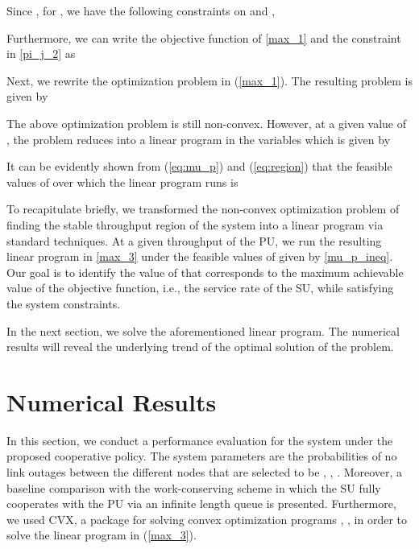 \documentclass[conference]{IEEEtran}
\begin{document}
Since , for , we have the
following constraints on  and ,


Furthermore, we can write the objective function of \eqref{max_1}
 and the constraint in \eqref{pi_j_2} as






Next, we rewrite the optimization problem in (\ref{max_1}). The resulting problem is given by


The above optimization problem is still non-convex. However, at a given
value of , the problem reduces into a linear program
in the variables  which is given by

It can be evidently shown from (\ref{eq:mu_p}) and (\ref{eq:region}) that
the feasible values of  over which the linear program runs is


To recapitulate briefly, we transformed the non-convex optimization problem
of finding the stable throughput region of the system
into a linear program via standard techniques. At a given throughput of the
PU, we run the resulting linear program in \eqref{max_3} under the feasible
values of  given by \eqref{mu_p_ineq}. Our goal is to
identify the value of  that corresponds to the maximum achievable
value of the objective function, i.e., the service rate of the SU,
while satisfying the system constraints.










In the next section, we solve the aforementioned
linear program. The numerical results will reveal the underlying
trend of the optimal solution of the problem.




\section{Numerical Results}
In this section, we conduct a performance evaluation for the system under the proposed cooperative policy. The system parameters are the probabilities of no link outages between the different nodes that are selected to be , , . Moreover, a baseline comparison with the work-conserving scheme in which the SU fully cooperates with the PU via an infinite length queue \cite{R_CoopAcc} is presented. Furthermore, we used CVX, a package for solving convex optimization programs \cite{cvx}, \cite{gb08}, in order to solve the linear program in (\ref{max_3}).
\end{document}
